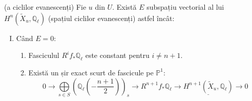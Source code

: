 \documentclass[13pt,openany]{book}
\begin{document}
\begin{teo}
(a ciclilor evanescenți) Fie $u$ din $U$. Există $E$ subspațiu vectorial al lui $H^n(\widetilde{X}_u,\mathbb{Q}_\ell)$ (spațiul ciclilor evanescenți) astfel încât:
\begin{enumerate}[I.]
\item Când $E=0$:
\begin{enumerate}[1.]
\item Fasciculul $R^i f_* \mathbb{Q}_\ell$ este constant pentru $i\neq n+1$.
\item Există un șir exact scurt de fascicule pe $\mathbb{P}^1$:
$$0 \rightarrow \bigoplus\limits_{s\in S} (\mathbb{Q}_\ell(-\frac{n+1}{2}))_s \rightarrow R^{n+1}f_*\mathbb{Q}_\ell \rightarrow \underline{H^{n+1}(\widetilde{X}_u,\mathbb{Q}_\ell)} \rightarrow 0$$
\end{enumerate}


\end{enumerate}
\end{teo}
\end{document}
